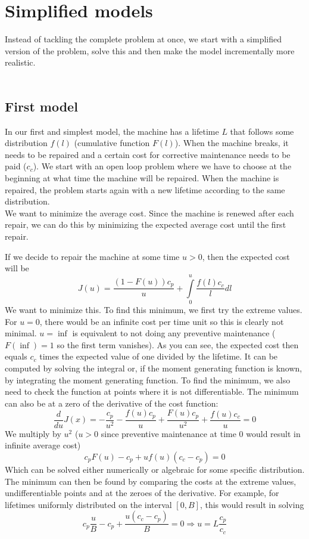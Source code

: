 \section{Simplified models}
Instead of tackling the complete problem at once, we start with a simplified version of the problem, solve this and then make the model incrementally more realistic.\\
\\
\subsection{First model}
In our first and simplest model, the machine has a lifetime $L$ that follows some distribution $f(l)$ (cumulative function $F(l)$). When the machine breaks, it needs to be repaired and a certain cost for corrective maintenance needs to be paid ($c_c$). We start with an open loop problem where we have to choose at the beginning at what time the machine will be repaired. 
When the machine is repaired, the problem starts again with a new lifetime according to the same distribution.\\
We want to minimize the average cost. Since the machine is renewed after each repair, we can do this by minimizing the expected average cost until the first repair.

If we decide to repair the machine at some time $u>0$, then the expected cost will be
$$
J(u)=\frac{(1-F(u))c_p}{u}+\int\limits_{0}^u\frac{f(l)c_c}{l}dl
$$
We want to minimize this. To find this minimum, we first try the extreme values. For $u=0$, there would be an infinite cost per time unit so this is clearly not minimal. $u=\inf$ is equivalent to not doing any preventive maintenance ($F(\inf)=1$ so the first term vanishes). As you can see, the expected cost then equals $c_c$ times the expected value of one divided by the lifetime. It can be computed by solving the integral or, if the moment generating function is known, by integrating the moment generating function. To find the minimum, we also need to check the function at points where it is not differentiable. The minimum can also be at a zero of the derivative of the cost function:
$$
\frac{d}{du}J(x)=-\frac{c_p}{u^2} - \frac{f(u)c_p}{u} +\frac{F(u)c_p}{u^2}+\frac{f(u)c_c}{u}=0
$$
We multiply by $u^2$ ($u>0$ since preventive maintenance at time 0 would result in infinite average cost)
$$
c_pF(u)-c_p+uf(u)(c_c-c_p)=0
$$
Which can be solved either numerically or algebraic for some specific distribution. The minimum can then be found by comparing the costs at the extreme values, undifferentiable points and at the zeroes of the derivative. For example, for lifetimes uniformly distributed on the interval $[0,B]$, this would result in solving
$$
c_p\frac{u}{B}-c_p+\frac{u(c_c-c_p)}{B}=0\Rightarrow u=L\frac{c_p}{c_c}
$$

